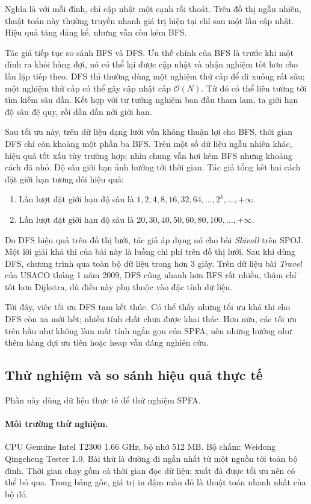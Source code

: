 \documentclass[11pt]{article}
\newcommand{\Oh}{\mathcal{O}}
\begin{document}
Nghĩa là với mỗi đỉnh, chỉ cập nhật một cạnh rồi thoát. Trên đồ thị ngẫu
nhiên, thuật toán này thường truyền nhanh giá trị hiện tại chỉ sau một lần cập
nhật. Hiệu quả tăng đáng kể, nhưng vẫn còn kém BFS.

Tác giả tiếp tục so sánh BFS và DFS. Ưu thế chính của BFS là trước khi một
đỉnh ra khỏi hàng đợi, nó có thể lại được cập nhật và nhận nghiệm tốt hơn cho
lần lặp tiếp theo. DFS thì thường dùng một nghiệm thứ cấp để đi xuống rất sâu;
một nghiệm thứ cấp có thể gây cập nhật cấp \(\Oh(N)\). Từ đó có thể liên
tưởng tới tìm kiếm sâu dần. Kết hợp với tư tưởng nghiệm ban đầu tham lam, ta
giới hạn độ sâu đệ quy, rồi dần dần nới giới hạn.

Sau tối ưu này, trên dữ liệu dạng lưới vốn không thuận lợi cho BFS, thời gian
DFS chỉ còn khoảng một phần ba BFS. Trên một số dữ liệu ngẫu nhiên khác, hiệu
quả tốt xấu tùy trường hợp; nhìn chung vẫn hơi kém BFS nhưng khoảng cách đã
nhỏ. Độ sâu giới hạn ảnh hưởng tới thời gian. Tác giả tổng kết hai cách đặt
giới hạn tương đối hiệu quả:
\begin{enumerate}
  \item Lần lượt đặt giới hạn độ sâu là
  \(1,2,4,8,16,32,64,\ldots,2^k,\ldots,+\infty\).
  \item Lần lượt đặt giới hạn độ sâu là
  \(20,30,40,50,60,80,100,\ldots,+\infty\).
\end{enumerate}

Do DFS hiệu quả trên đồ thị lưới, tác giả áp dụng nó cho bài \textit{Skivall}
trên SPOJ. Một lời giải khả thi của bài này là luồng chi phí trên đồ thị lưới.
Sau khi dùng DFS, chương trình qua toàn bộ dữ liệu trong hơn 3 giây. Trên dữ
liệu bài \textit{Travel} của USACO tháng 1 năm 2009, DFS cũng nhanh hơn BFS
rất nhiều, thậm chí tốt hơn Dijkstra, dù điều này phụ thuộc vào đặc tính dữ
liệu.

Tới đây, việc tối ưu DFS tạm kết thúc. Có thể thấy những tối ưu khả thi cho
DFS còn xa mới hết; nhiều tính chất chưa được khai thác. Hơn nữa, các tối ưu
trên hầu như không làm mất tính ngắn gọn của SPFA, nên những hướng như thêm
hàng đợi ưu tiên hoặc heap vẫn đáng nghiên cứu.

\subsection{Thử nghiệm và so sánh hiệu quả thực tế}

Phần này dùng dữ liệu thực tế để thử nghiệm SPFA.

\paragraph{Môi trường thử nghiệm.}
CPU Genuine Intel T2300 1.66 GHz, bộ nhớ 512 MB. Bộ chấm: Weidong Qingcheng
Tester 1.0. Bài thử là đường đi ngắn nhất từ một nguồn tới toàn bộ đỉnh. Thời
gian chạy gồm cả thời gian đọc dữ liệu; xuất đã được tối ưu nên có thể bỏ qua.
Trong bảng gốc, giá trị in đậm màu đỏ là thuật toán nhanh nhất của bộ đó.
\end{document}
